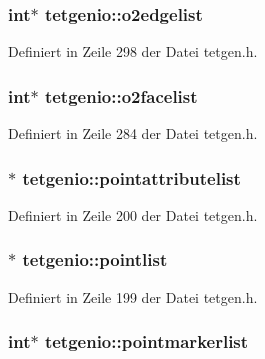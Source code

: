 \hypertarget{classtetgenio_a0bf45168ac1af3d5b5ccaf8fe4cb13e3}{
\subsubsection[{o2edgelist}]{\setlength{\rightskip}{0pt plus 5cm}int$\ast$ tetgenio\-::o2edgelist}}\label{classtetgenio_a0bf45168ac1af3d5b5ccaf8fe4cb13e3}


Definiert in Zeile 298 der Datei tetgen.\-h.

\hypertarget{classtetgenio_aad1e2f66ad5c438fb2bee5d510fdca19}{
\subsubsection[{o2facelist}]{\setlength{\rightskip}{0pt plus 5cm}int$\ast$ tetgenio\-::o2facelist}}\label{classtetgenio_aad1e2f66ad5c438fb2bee5d510fdca19}


Definiert in Zeile 284 der Datei tetgen.\-h.

\hypertarget{classtetgenio_a4273b235ec6260723bae849c3184ae6f}{
\subsubsection[{pointattributelist}]{$\ast$ tetgenio\-::pointattributelist}}\label{classtetgenio_a4273b235ec6260723bae849c3184ae6f}


Definiert in Zeile 200 der Datei tetgen.\-h.

\hypertarget{classtetgenio_a69b1e0f645f57281d838569c2bbc5789}{
\subsubsection[{pointlist}]{$\ast$ tetgenio\-::pointlist}}\label{classtetgenio_a69b1e0f645f57281d838569c2bbc5789}


Definiert in Zeile 199 der Datei tetgen.\-h.

\hypertarget{classtetgenio_afc154d429cb5344b1ea12318b094a2c8}{
\subsubsection[{pointmarkerlist}]{\setlength{\rightskip}{0pt plus 5cm}int$\ast$ tetgenio\-::pointmarkerlist}}\label{classtetgenio_afc154d429cb5344b1ea12318b094a2c8}


